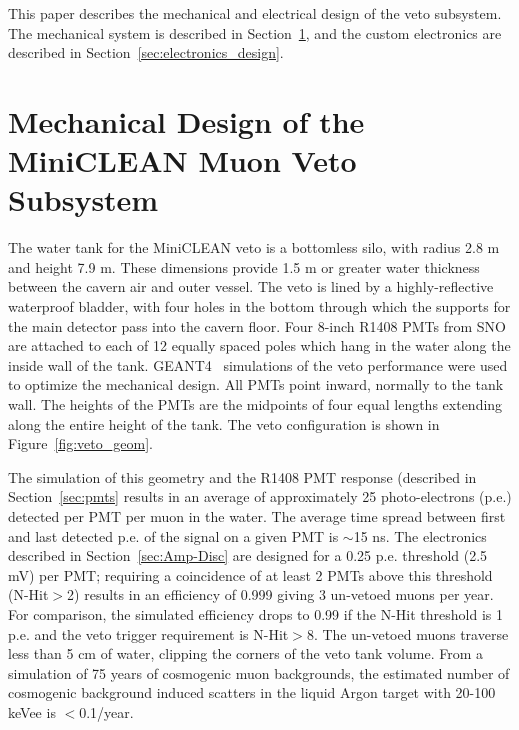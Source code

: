 \documentclass{JINST}
\begin{document}
This paper describes the mechanical and electrical design of the veto subsystem.  The mechanical system is described in Section~\ref{sec:subsystem_design}, and the custom electronics are described in Section~\ref{sec:electronics_design}.


\section{Mechanical Design of the MiniCLEAN Muon Veto Subsystem}
\label{sec:subsystem_design}
%
The water tank for the MiniCLEAN veto is a bottomless silo, with
radius 2.8 m and height 7.9 m. These dimensions provide 1.5 m or
greater water thickness between the cavern air and outer vessel. The
veto is lined by a highly-reflective waterproof bladder, with four
holes in the bottom through which the supports for the main detector
pass into the cavern floor. Four 8-inch R1408 PMTs from SNO are
attached to each of 12 equally spaced poles which hang in the water
along the inside wall of the tank. GEANT4~\cite{ref:geant4} simulations
of the veto performance were used to optimize the mechanical
design. All PMTs point inward, normally to the tank wall. The heights
of the PMTs are the midpoints of four equal lengths extending along
the entire height of the tank. The veto configuration is shown in
Figure~\ref{fig:veto_geom}.  

The simulation of this geometry and the R1408 PMT response (described
in Section~\ref{sec:pmts} results in an average of approximately 25
photo-electrons (p.e.) detected per PMT per muon in the water.  The
average time spread between first and last detected p.e. of the signal
on a given PMT is $\sim$15 ns.  The electronics described in
Section~\ref{sec:Amp-Disc} are designed for a 0.25 p.e. threshold (2.5
mV) per PMT; requiring a coincidence of at least 2 PMTs above this
threshold (N-Hit$>$2) results in an efficiency of 0.999 giving 3
un-vetoed muons per year.  For comparison, the simulated efficiency
drops to 0.99 if the N-Hit threshold is 1 p.e. and the veto trigger
requirement is N-Hit$>$8.  The un-vetoed muons traverse less than 5 cm
of water, clipping the corners of the veto tank volume.  From a
simulation of 75 years of cosmogenic muon backgrounds, the estimated
number of cosmogenic background induced scatters in the liquid Argon
target with 20-100 keVee is $<$0.1/year.
\end{document}
